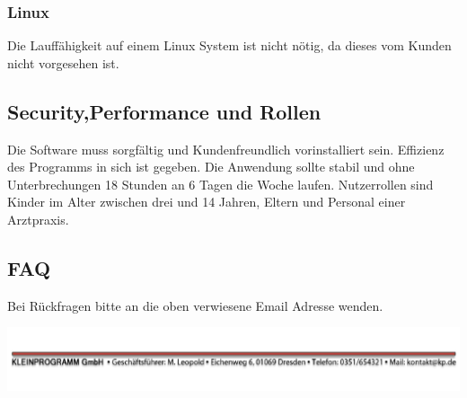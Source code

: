 \documentclass[12pt]{article}
\begin{document}
\subsubsection{Linux}
Die Lauffähigkeit auf einem Linux System ist nicht nötig, da dieses vom Kunden nicht vorgesehen ist.
\subsection{Security,Performance und Rollen}
Die Software muss sorgfältig und Kundenfreundlich vorinstalliert sein. Effizienz des Programms in sich ist gegeben. Die Anwendung sollte stabil und ohne Unterbrechungen 18 Stunden an 6 Tagen die Woche laufen. Nutzerrollen sind Kinder im Alter zwischen drei und                     14 Jahren, Eltern und Personal einer Arztpraxis.
\subsection{FAQ}
Bei Rückfragen bitte an die oben verwiesene Email Adresse wenden.
\newpage


\vspace*{\fill}
\includegraphics[scale=0.9]{footer.pdf}
\thispagestyle{empty}
\end{document}
